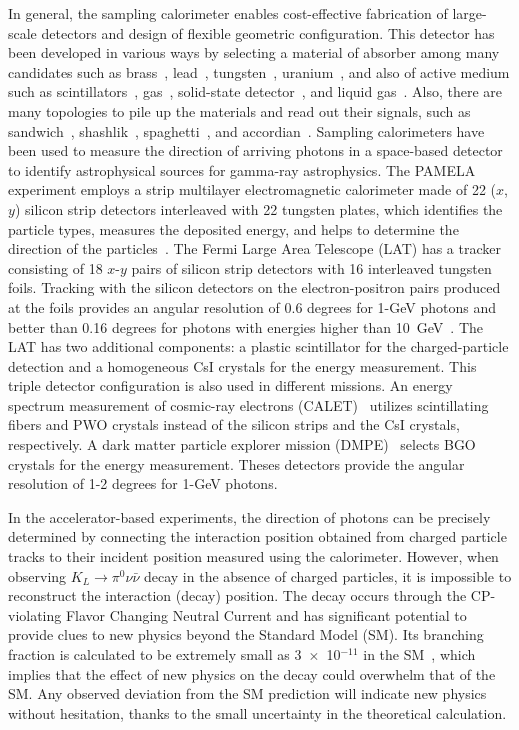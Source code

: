 \documentclass[12pt,times,draftclsnofoot,a4paper]{elsarticle}
\begin{document}
In general, the sampling calorimeter enables cost-effective fabrication of large-scale detectors and design of flexible geometric configuration. This detector has been developed in various ways by selecting a material of absorber among many candidates such as brass~\cite{CMS:mat}, lead~\cite{CDF:mat}, tungsten~\cite{DELPHI:mat}, uranium~\cite{UGAS:mat}, and also of active medium such as scintillators~\cite{CMS:mat,CDF:mat}, gas~\cite{UGAS:mat}, solid-state detector~\cite{DELPHI:mat}, and liquid gas~\cite{LiqAR:mat}. Also, there are many topologies to pile up the materials and read out their signals, such as sandwich~\cite{KOTO:MB}, shashlik~\cite{shashlik:con}, spaghetti~\cite{KLOE:con}, and accordian~\cite{LiqAR:mat}. Sampling calorimeters have been used to measure the direction of arriving photons in a space-based detector to identify astrophysical sources for gamma-ray astrophysics. The PAMELA experiment employs a strip multilayer electromagnetic calorimeter made of 22 ($x$, $y$) silicon strip detectors interleaved with 22 tungsten plates, which identifies the particle types, measures the deposited energy, and helps to determine the direction of the particles~\cite{PAMELA}. The Fermi Large Area Telescope (LAT) has a tracker consisting of 18 $x$-$y$ pairs of silicon strip detectors with 16 interleaved tungsten foils. Tracking with the silicon detectors on the electron-positron pairs produced at the foils provides an angular resolution of 0.6 degrees for 1-GeV photons and better than 0.16 degrees for photons with energies higher than 10~GeV~\cite{FERMI:LAT}. The LAT has two additional components: a plastic scintillator for the charged-particle detection and a homogeneous CsI crystals for the energy measurement. This triple detector configuration is also used in different missions. An energy spectrum measurement of cosmic-ray electrons (CALET)~\cite{CALET} utilizes scintillating fibers and PWO crystals instead of the silicon strips and the CsI crystals, respectively. A dark matter particle explorer mission (DMPE)~\cite{DMPE} selects BGO crystals for the energy measurement. Theses detectors provide the angular resolution of 1-2 degrees for 1-GeV photons.

In the accelerator-based experiments, the direction of photons can be precisely determined by connecting the interaction position obtained from charged particle tracks to their incident position measured using the calorimeter. However, when observing $K_{L} \rightarrow \pi^{0}\nu\bar{\nu}$ decay in the absence of charged particles, it is impossible to reconstruct the interaction (decay) position. The decay occurs through the CP-violating Flavor Changing Neutral Current and has significant potential to provide clues to new physics beyond the Standard Model (SM). Its branching fraction is calculated to be extremely small as 3~$\times$~10$^{-11}$ in the SM~\cite{KOTOtheory}, which implies that the effect of new physics on the decay could overwhelm that of the SM. Any observed deviation from the SM prediction will indicate new physics without hesitation, thanks to the small uncertainty in the theoretical calculation.
\end{document}
